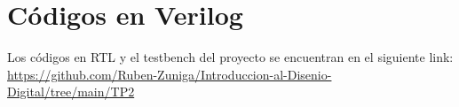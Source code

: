 \appendix

\section{Códigos en Verilog} \label{appx:rtl}

Los códigos en RTL y el testbench del proyecto se encuentran en el siguiente link: \url{https://github.com/Ruben-Zuniga/Introduccion-al-Disenio-Digital/tree/main/TP2}





